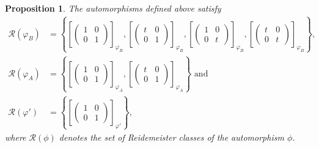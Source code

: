 \documentclass[a4paper,11pt]{amsart}
\numberwithin{equation}{section}
\theoremstyle{plain}
\newtheorem{pps}[thm]{Proposition}
\theoremstyle{definition}
\newcommand{\phee}{\varphi} %
\begin{document}
\begin{pps}\label{pps:norifqttmo} The automorphisms defined above satisfy 
\begin{align*}\mathcal{R}(\phee_{B})&=\left\{\left[\left(\begin{smallmatrix} 1&0\\0&1 \end{smallmatrix}\right)\right]_{\phee_{B}},\left[\left(\begin{smallmatrix} t&0\\0&1 \end{smallmatrix}\right)\right]_{\phee_{B}},\left[\left(\begin{smallmatrix} 1&0\\0&t \end{smallmatrix}\right)\right]_{\phee_{B}},\left[\left(\begin{smallmatrix} t&0\\0&t \end{smallmatrix}\right)\right]_{\phee_{B}}\right\},\\
\mathcal{R}(\phee_{A})&=\left\{\left[\left(\begin{smallmatrix} 1&0\\0&1 \end{smallmatrix}\right)\right]_{\phee_{A}},\left[\left(\begin{smallmatrix} t&0\\0&1 \end{smallmatrix}\right)\right]_{\phee_{A}}\right\} \text{ and }\\
\mathcal{R}(\phee')&=\left\{\left[\left(\begin{smallmatrix} 1&0\\0&1 \end{smallmatrix}\right)\right]_{\phee'}\right\},
\end{align*}
where $\mathcal{R}(\phi)$ denotes the set of Reidemeister classes of the automorphism $\phi$.
\end{pps}
\end{document}
